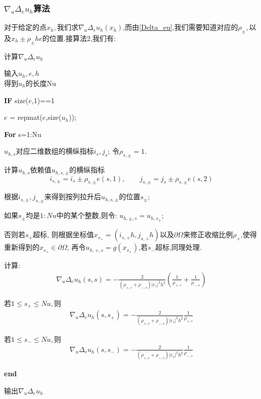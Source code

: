 \documentclass[11pt]{article}
\begin{document}
\subsubsection{$\nabla{}_u\Delta{}_eu_h$算法}
对于给定的点$x_h,$我们求$\nabla{}_u\Delta{}_eu_h(x_h)$,而由\eqref{Delta_eu},我们需要知道对应的$\rho_\pm,$以及$x_h\pm\rho_\pm he$的位置.接算法2,我们有:


\begin{algorithm}[H]
\caption{计算$\nabla{}_u\Delta_eu_h$} 
\begin{algorithmic}[]
\STATE 输入$u_h,e,h$\\

\STATE 得到$u_h$的长度Nu

\STATE \textbf{IF} size($e$,1)==1


\STATE\qquad $e$ = repmat($e$,size($u_h$));
 
\STATE  \textbf{For} s=1:Nu

\STATE\qquad $u_{h,s}$对应二维数组的横纵指标$i_s,j_s$; 令$\rho_{s,\pm}=1.$

\STATE \qquad 计算$u_{h,s}$依赖值$u_{h,s,\pm}$的横纵指标$$i_{s,\pm}=i_s\pm \rho_{s,\pm}e(s,1),\qquad j_{s,\pm}=j_s\pm \rho_{s,\pm}e(s,2)$$

\STATE\qquad 根据$i_{s,\pm},j_{s,\pm}$来得到按列拉升后$u_{h,s,\pm}$的位置$s_{\pm}$;

\STATE \qquad 如果$s_\pm$均是$1:Nu$中的某个整数,则令:
$u_{h,\pm,s}=u_{h,s_\pm}$;

\STATE \qquad 否则若$s_+$超标, 则根据坐标值$x_{s_+}=(i_{s,+}h,j_{s,+}h)$以及$\partial\Omega$来修正收缩比例$\rho_+$,使得重新得到的$x_{s_+}\in \partial\Omega$, 再令$u_{h,+,s}=g(x_{s_+})$,若$s_-$超标,同理处理.

\STATE \qquad 计算:
$$\begin{array}{c}
\nabla{}_u\Delta_{e}u_{h}(s,s) = -\frac{2}{\left(\rho_{+,s}+\rho_{-,s}\right)|e_s|^{2} h^{2}}\left(\frac{1}{\rho_{+,s}}+\frac{1}{\rho_{-,s}}\right)
\end{array}$$

\STATE \qquad 若$1\leqslant s_+\leqslant Nu,$则
$$\begin{array}{c}
\nabla{}_u\Delta_{e}u_{h}(s,s_+) = -\frac{2}{\left(\rho_{+,s}+\rho_{-,s}\right)|e_s|^{2} h^{2}}\frac{1}{\rho_{+,s}}
\end{array}$$

\STATE \qquad 若$1\leqslant s_-\leqslant Nu,$则
$$\begin{array}{c}
\nabla{}_u\Delta_{e}u_{h}(s,s_-) = -\frac{2}{\left(\rho_{+,s}+\rho_{-,s}\right)|e_s|^{2} h^{2}}\frac{1}{\rho_{-,s}}
\end{array}$$

\STATE \textbf{end}

\STATE 输出$\nabla{}_u\Delta_eu_h$
\end{algorithmic}
\end{algorithm}
\end{document}
